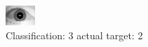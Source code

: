 \begin{figure}[h!]
\begin{center}
\includegraphics[width=0.60\columnwidth]{figures/ID1641_class_3_target_2.png}
\end{center}
\caption{ Classification: 3 actual target: 2}
\label{fig:ID1641_class_3_target_2}
\end{figure}

